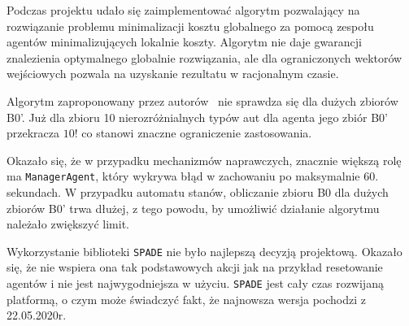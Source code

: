 Podczas projektu udało się zaimplementować algorytm pozwalający na rozwiązanie problemu minimalizacji kosztu globalnego za pomocą zespołu agentów minimalizujących lokalnie koszty. Algorytm nie daje gwarancji znalezienia optymalnego globalnie rozwiązania, ale dla ograniczonych wektorów wejściowych pozwala na uzyskanie rezultatu w racjonalnym czasie.

Algorytm zaproponowany przez autorów~\cite{wooldridge1996production} nie sprawdza się dla dużych zbiorów B0'. Już dla zbioru 10 nierozróżnialnych typów aut dla agenta jego zbiór B0' przekracza $10!$ co stanowi znaczne ograniczenie zastosowania. 

Okazało się, że w przypadku mechanizmów naprawczych, znacznie większą rolę ma \texttt{ManagerAgent}, który wykrywa błąd w zachowaniu po maksymalnie 60. sekundach. W przypadku automatu stanów, obliczanie zbioru B0 dla dużych zbiorów B0' trwa dłużej, z tego powodu, by umożliwić działanie algorytmu należało zwiększyć limit.


Wykorzystanie biblioteki \texttt{SPADE} nie było najlepszą decyzją projektową. Okazało się, że nie wspiera ona tak podstawowych akcji jak na przykład resetowanie agentów i nie jest najwygodniejsza w użyciu. \texttt{SPADE} jest cały czas rozwijaną platformą, o czym może świadczyć fakt, że najnowsza wersja pochodzi z 22.05.2020r.
